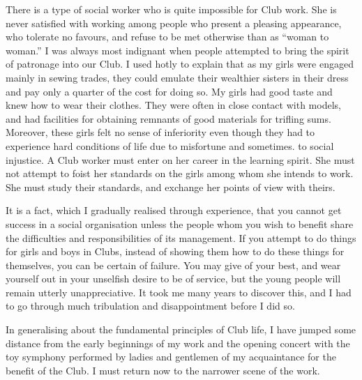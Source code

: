 There is a type of social worker who is quite impossible
for Club work. She is never satisfied with working among
people who present a pleasing appearance, who tolerate
no favours, and refuse to be met otherwise than as
“woman to woman.” I was always most indignant when
people attempted to bring the spirit of patronage into
our Club. I used hotly to explain that as my girls were
engaged mainly in sewing trades, they could emulate their
wealthier sisters in their dress and pay only a quarter of
the cost for doing so. My girls had good taste and knew
how to wear their clothes. They were often in close contact
with models, and had facilities for obtaining remnants
of good materials for trifling sums. Moreover, these
girls felt no sense of inferiority even though they had to
experience hard conditions of life due to misfortune and
sometimes. to social injustice. A Club worker must enter
on her career in the learning spirit. She must not attempt
to foist her standards on the girls among whom she intends
to work. She must study their standards, and exchange
her points of view with theirs.

It is a fact, which I gradually realised through experience,
that you cannot get success in a social organisation
unless the people whom you wish to benefit share the
difficulties and responsibilities of its management. If you
attempt to do things for girls and boys in Clubs, instead of
showing them how to do these things for themselves, you
can be certain of failure. You may give of your best, and
wear yourself out in your unselfish desire to be of service,
but the young people will remain utterly unappreciative.
It took me many years to discover this, and I had to go
through much tribulation and disappointment before I
did so.

In generalising about the fundamental principles of
Club life, I have jumped some distance from the early
beginnings of my work and the opening concert with the
toy symphony performed by ladies and gentlemen of my
acquaintance for the benefit of the Club. I must return
now to the narrower scene of the work.

